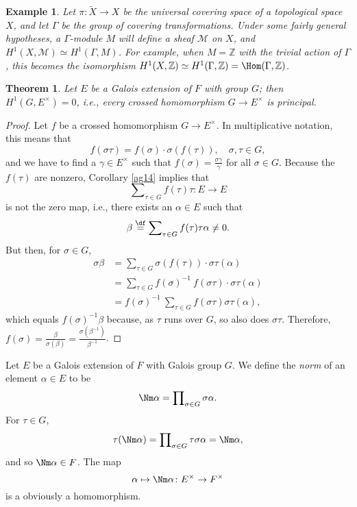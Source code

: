 \documentclass[a4paper,11pt,final,openany]{memoir}
\newtheorem{theorem}[X]{Theorem}
\newtheorem{example}[X]{Example}
\theoremstyle{nonumberplain}
\newtheorem{proof}{Proof.}
\begin{document}
\begin{example}
\label{ag17}Let $\pi\colon\tilde{X}\rightarrow X$ be the universal covering
space of a topological space $X$, and let $\Gamma$ be the group of covering
transformations. Under some fairly general hypotheses, a $\Gamma$-module $M$
will define a sheaf $\mathcal{M}$ on $X$, and $H^{1}(X,\mathcal{M})\simeq
H^{1}(\Gamma,M)$. For example, when $M=\mathbb{Z}$ with the trivial action of
$\Gamma$, this becomes the isomorphism $H^{1}(X,\mathbb{Z})\simeq H^{1}%
(\Gamma,\mathbb{Z})=\Hom(\Gamma,\mathbb{Z})$.
\end{example}

\begin{theorem}
\label{ag18}Let $E$ be a Galois extension of $F$ with group $G$; then
$H^{1}(G,E^{\times})=0$, i.e., every crossed homomorphism $G\rightarrow
E^{\times}$ is principal.
\end{theorem}

\begin{proof}
Let $f$ be a crossed homomorphism $G\rightarrow E^{\times}$. In multiplicative
notation, this means that
\[
f(\sigma\tau)=f(\sigma)\cdot\sigma(f(\tau)),\quad\sigma,\tau\in G,
\]
and we have to find a $\gamma\in E^{\times}$ such that $f(\sigma)=\frac
{\sigma\gamma}{\gamma}$ for all $\sigma\in G$. Because the $f(\tau)$ are
nonzero, Corollary \ref{ag14} implies that
\[
\sum\nolimits_{\tau\in G}f(\tau)\tau\colon E\rightarrow E
\]
is not the zero map, i.e., there exists an $\alpha\in E$ such that
\[
\beta\overset{\df}{=}\sum\nolimits_{\tau\in G}f(\tau
)\tau\alpha\neq0.
\]
But then, for $\sigma\in G$,
\begin{align*}
\sigma\beta &  =\sum\nolimits_{\tau\in G}\sigma(f(\tau))\cdot\sigma\tau
(\alpha)\\
&  =\sum\nolimits_{\tau\in G}f(\sigma)^{-1}\ f(\sigma\tau)\cdot\sigma
\tau(\alpha)\\
&  =f(\sigma)^{-1}\ \sum\nolimits_{\tau\in G}f(\sigma\tau)\sigma\tau(\alpha),
\end{align*}
which equals $f(\sigma)^{-1}\beta$ because, as $\tau$ runs over $G$, so also
does $\sigma\tau$. Therefore, $f(\sigma)=\frac{\beta}{\sigma(\beta)}%
=\frac{\sigma(\beta^{-1})}{\beta^{-1}}$.
\end{proof}

Let $E$ be a Galois extension of $F$ with Galois group $G$. We define the
\emph{norm}%
%
\emph{\/} of an element $\alpha\in E$ to be
\[
\Nm\alpha=\prod\nolimits_{\sigma\in G}\sigma\alpha.
\]
For $\tau\in G$,
\[
\tau(\Nm\alpha)=\prod\nolimits_{\sigma\in G}\tau\sigma\alpha=\Nm\alpha,
\]
and so $\Nm\alpha\in F$. The map
\[
\alpha\mapsto\Nm\alpha\colon E^{\times}\rightarrow F^{\times}%
\]
is a obviously a homomorphism.
\end{document}
